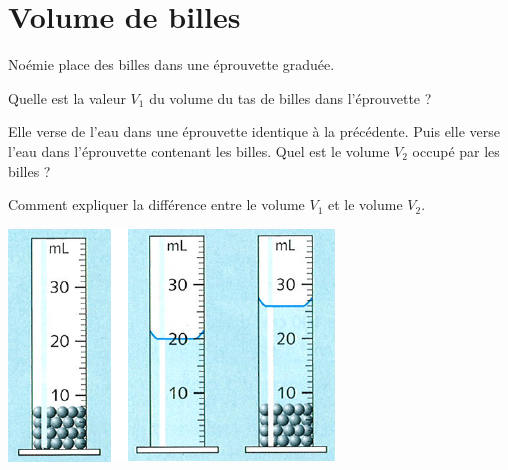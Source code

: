 \section{Volume de billes}


\begin{multicols}{2}
	

Noémie place des billes dans une éprouvette graduée.

\begin{questions}
	\question Quelle est la valeur $V_1$ du volume du tas de billes dans l'éprouvette ? 
	
	\question Elle verse de l'eau dans une éprouvette identique à la précédente. Puis elle verse l'eau dans l'éprouvette contenant les billes. Quel est le volume $V_2$ occupé par les billes ?
	
	\question Comment expliquer la différence entre le volume $V_1$ et le volume $V_2$.
\end{questions}


\begin{center}
	\includegraphics[scale=0.8]{img/billes}
\end{center}
\end{multicols}